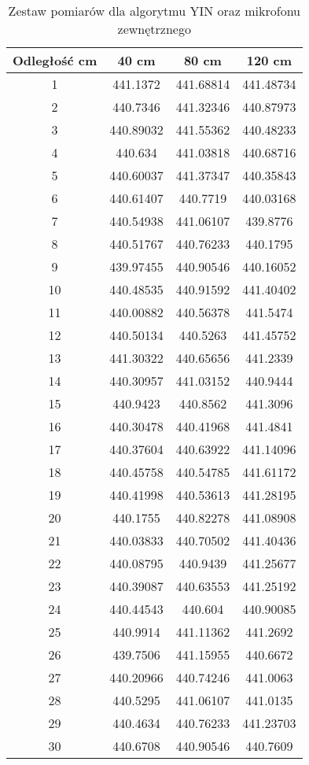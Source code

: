 \begin{table}
\begin{center}
\caption[Zestaw pomiarów dla algorytmu YIN oraz mikrofonu zewnętrznego]{Zestaw pomiarów dla algorytmu YIN oraz mikrofonu zewnętrznego}
\begin{tabular}{|c|c|c|c|}
\hline
{\bf Odległość cm} & {\bf 40 cm} & {\bf 80 cm} & {\bf 120 cm} \\ 
\hline
\hline
1  & 441.1372  & 441.68814 & 441.48734 \\ \hline
2  & 440.7346  & 441.32346 & 440.87973 \\ \hline
3  & 440.89032 & 441.55362 & 440.48233 \\ \hline
4  & 440.634   & 441.03818 & 440.68716 \\ \hline
5  & 440.60037 & 441.37347 & 440.35843 \\ \hline
6  & 440.61407 & 440.7719  & 440.03168 \\ \hline
7  & 440.54938 & 441.06107 & 439.8776  \\ \hline
8  & 440.51767 & 440.76233 & 440.1795  \\ \hline
9  & 439.97455 & 440.90546 & 440.16052 \\ \hline
10 & 440.48535 & 440.91592 & 441.40402 \\ \hline
11 & 440.00882 & 440.56378 & 441.5474  \\ \hline
12 & 440.50134 & 440.5263  & 441.45752 \\ \hline
13 & 441.30322 & 440.65656 & 441.2339  \\ \hline
14 & 440.30957 & 441.03152 & 440.9444  \\ \hline
15 & 440.9423  & 440.8562  & 441.3096  \\ \hline
16 & 440.30478 & 440.41968 & 441.4841  \\ \hline
17 & 440.37604 & 440.63922 & 441.14096 \\ \hline
18 & 440.45758 & 440.54785 & 441.61172 \\ \hline
19 & 440.41998 & 440.53613 & 441.28195 \\ \hline
20 & 440.1755  & 440.82278 & 441.08908 \\ \hline
21 & 440.03833 & 440.70502 & 441.40436 \\ \hline
22 & 440.08795 & 440.9439  & 441.25677 \\ \hline
23 & 440.39087 & 440.63553 & 441.25192 \\ \hline
24 & 440.44543 & 440.604   & 440.90085 \\ \hline
25 & 440.9914  & 441.11362 & 441.2692  \\ \hline
26 & 439.7506  & 441.15955 & 440.6672  \\ \hline
27 & 440.20966 & 440.74246 & 441.0063  \\ \hline
28 & 440.5295  & 441.06107 & 441.0135  \\ \hline
29 & 440.4634  & 440.76233 & 441.23703 \\ \hline
30 & 440.6708  & 440.90546 & 440.7609  \\ \hline
\end{tabular}
\label{table:przyklad}
\end{center}
\end{table}


